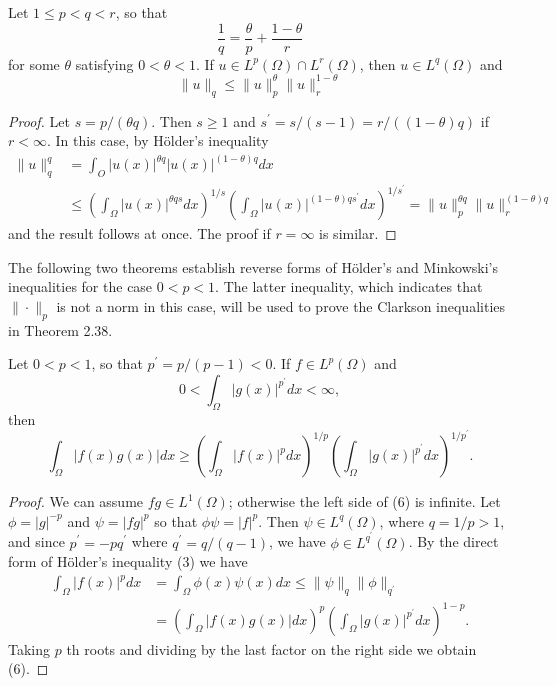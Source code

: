 \begin{theorem}
  Let $1 \leq p<q<r$, so that
  \[
  \frac{1}{q}=\frac{\theta}{p}+\frac{1-\theta}{r}
  \]
  for some $\theta$ satisfying $0<\theta<1$. If $u \in L^p(\Omega) \cap L^r(\Omega)$, then $u \in L^q(\Omega)$ and
  \[
  \|u\|_q \leq\|u\|_p^\theta\|u\|_r^{1-\theta}
  \]
\end{theorem}

\begin{proof}
  Let $s=p /(\theta q)$. Then $s \geq 1$ and $s^{\prime}=s /(s-1)=r /((1-\theta) q)$ if $r<\infty$. In this case, by Hölder's inequality
  \[
  \begin{aligned}
  \|u\|_q^q & =\int_O|u(x)|^{\theta q}|u(x)|^{(1-\theta) q} d x \\
  & \leq\left(\int_{\Omega}|u(x)|^{\theta q s} d x\right)^{1 / s}\left(\int_{\Omega}|u(x)|^{(1-\theta) q s^{\prime}} d x\right)^{1 / s^{\prime}}=\|u\|_p^{\theta q}\|u\|_r^{(1-\theta) q}
  \end{aligned}
  \]
  and the result follows at once. The proof if $r=\infty$ is similar.
\end{proof}

The following two theorems establish reverse forms of Hölder's and Minkowski's inequalities for the case $0<p<1$. The latter inequality, which indicates that $\|\cdot\|_p$ is not a norm in this case, will be used to prove the Clarkson inequalities in Theorem 2.38.

\begin{theorem}
  Let $0<p<1$, so that $p^{\prime}=p /(p-1)<0$. If $f \in L^p(\Omega)$ and
  \[
  0<\int_{\Omega}|g(x)|^{p^{\prime}} d x<\infty,
  \]
  then
  \begin{equation}\label{eq:2.6}
    \int_{\Omega}|f(x) g(x)| d x \geq\left(\int_{\Omega}|f(x)|^p d x\right)^{1 / p}\left(\int_{\Omega}|g(x)|^{p^{\prime}} d x\right)^{1 / p^{\prime}}.
  \end{equation}
\end{theorem}

\begin{proof}
  We can assume $f g \in L^1(\Omega)$; otherwise the left side of (6) is infinite. Let $\phi=|g|^{-p}$ and $\psi=|f g|^p$ so that $\phi \psi=|f|^p$. Then $\psi \in L^q(\Omega)$, where $q=1 / p>1$, and since $p^{\prime}=-p q^{\prime}$ where $q^{\prime}=q /(q-1)$, we have $\phi \in L^{q^{\prime}}(\Omega)$. By the direct form of Hölder's inequality (3) we have
  \[
  \begin{aligned}
  \int_{\Omega}|f(x)|^p d x & =\int_{\Omega} \phi(x) \psi(x) d x \leq\|\psi\|_q\|\phi\|_{q^{\prime}} \\
  & =\left(\int_{\Omega}|f(x) g(x)| d x\right)^p\left(\int_{\Omega}|g(x)|^{p^{\prime}} d x\right)^{1-p} .
  \end{aligned}
  \]
  Taking $p$ th roots and dividing by the last factor on the right side we obtain (6).
\end{proof}



